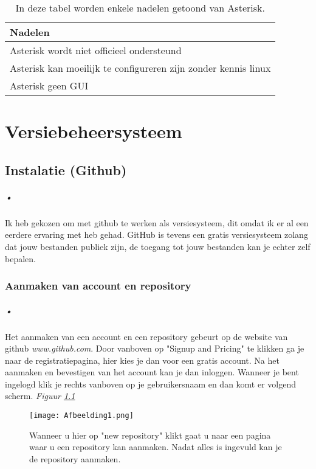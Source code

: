 \documentclass[12pt,a4paper]{report}
\begin{document}
\begin{table} [h]
\begin{tabular}{ | l | }
  \hline
  Nadelen\\
  \hline
  Asterisk wordt niet officieel ondersteund\\
  Asterisk kan moeilijk te configureren zijn zonder kennis linux\\
  Asterisk geen GUI\\
  \hline
\end{tabular}
\caption[Nadelen Asterisk]{In deze tabel worden enkele nadelen getoond van Asterisk.}
\end{table}

\appendix
\chapter{Versiebeheersysteem}
\section{Instalatie (Github)}
\paragraph{•}
Ik heb gekozen om met github te werken als versiesysteem, dit omdat ik er al een eerdere ervaring met heb gehad. GitHub is tevens een gratis versiesysteem zolang dat jouw bestanden publiek zijn, de toegang tot jouw bestanden kan je echter zelf bepalen.

\subsection{Aanmaken van account en repository}
\paragraph{•}
Het aanmaken van een account en een repository gebeurt op de website van github \emph{www.github.com}. Door vanboven op "Signup and Pricing" te klikken ga je naar de registratiepagina, hier kies je dan voor een gratis account. Na het aanmaken en bevestigen van het account kan je dan inloggen. Wanneer je bent ingelogd klik je rechts vanboven op je gebruikersnaam en dan komt er volgend scherm. \emph{Figuur \ref{afbeelding1}}
\begin{figure} [h]
\texttt{[image: Afbeelding1.png]}
\caption[Aanmaken repository]{Wanneer u hier op "new repository" klikt gaat u naar een pagina waar u een repository kan aanmaken. Nadat alles is ingevuld kan je de repository aanmaken.}
\label{afbeelding1}
\end{figure}
\end{document}
